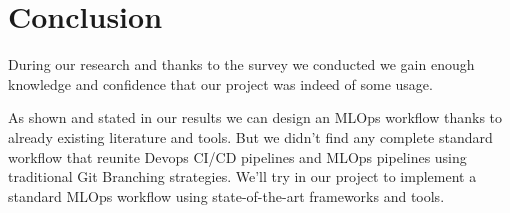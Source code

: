 \section{Conclusion}\label{sec:stconclusion}

During our research and thanks to the survey we conducted we gain enough knowledge and confidence that our project was indeed of some usage.

As shown and stated in our results we can design an MLOps workflow thanks to already existing literature and tools.
But we didn't find any complete standard workflow that reunite Devops CI/CD pipelines and MLOps pipelines using traditional Git Branching strategies.
We'll try in our project to implement a standard MLOps workflow using state-of-the-art frameworks and tools.